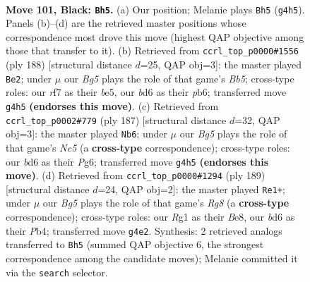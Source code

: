 \documentclass[11pt]{article}
\begin{document}
\clearpage

\begin{figure}[p]\centering
\begin{subfigure}{0.46\textwidth}\centering
\resizebox{\linewidth}{!}{%
\newchessgame
\chessboard[
  setfen={3k4/5R2/PP1B4/3N4/4B1b1/1K5p/8/6r1 b - - 2 101},
  showmover=false,
  pgfstyle=straightmove, color=movearrow, markmove={g4-h5}
]}
\caption{}
\end{subfigure}\hfill
\begin{subfigure}{0.46\textwidth}\centering
\resizebox{\linewidth}{!}{%
\newchessgame
\chessboard[
  setfen={5k2/7R/1p2p3/1B1bb3/P5K1/8/8/8 w - - 5 95},
  showmover=false,
  pgfstyle=straightmove, color=movearrow, markmove={b5-e2}
]}
\caption{}
\end{subfigure}
\\[4pt]
\begin{subfigure}{0.46\textwidth}\centering
\resizebox{\linewidth}{!}{%
\newchessgame
\chessboard[
  setfen={8/3r3p/6p1/8/2n2B2/7P/R5P1/4k1K1 b - - 61 94},
  showmover=false,
  pgfstyle=straightmove, color=movearrow, markmove={c4-b6}
]}
\caption{}
\end{subfigure}\hfill
\begin{subfigure}{0.46\textwidth}\centering
\resizebox{\linewidth}{!}{%
\newchessgame
\chessboard[
  setfen={4b3/4k1p1/8/4K3/1p5P/3B4/1PR5/6r1 b - - 4 95},
  showmover=false,
  pgfstyle=straightmove, color=movearrow, markmove={g1-e1}
]}
\caption{}
\end{subfigure}
\caption{\textbf{Move 101, Black: \texttt{Bh5}.} (a) Our position; Melanie plays \texttt{Bh5} (\texttt{g4h5}). Panels (b)--(d) are the retrieved master positions whose correspondence most drove this move (highest QAP objective among those that transfer to it). (b) Retrieved from \texttt{ccrl\_top\_p0000\#1556} (ply 188) [structural distance $d$=25, QAP obj=3]: the master played \texttt{Be2}; under $\mu$ our \emph{Bg5} plays the role of that game's \emph{Bb5}; cross-type roles: our \emph{r}f7 as their \emph{b}e5, our \emph{b}d6 as their \emph{p}b6; transferred move \texttt{g4h5} \textbf{(endorses this move)}. (c) Retrieved from \texttt{ccrl\_top\_p0002\#779} (ply 187) [structural distance $d$=32, QAP obj=3]: the master played \texttt{Nb6}; under $\mu$ our \emph{Bg5} plays the role of that game's \emph{Nc5} (a \textbf{cross-type} correspondence); cross-type roles: our \emph{b}d6 as their \emph{P}g6; transferred move \texttt{g4h5} \textbf{(endorses this move)}. (d) Retrieved from \texttt{ccrl\_top\_p0000\#1294} (ply 189) [structural distance $d$=24, QAP obj=2]: the master played \texttt{Re1+}; under $\mu$ our \emph{Bg5} plays the role of that game's \emph{Rg8} (a \textbf{cross-type} correspondence); cross-type roles: our \emph{R}g1 as their \emph{B}e8, our \emph{b}d6 as their \emph{P}b4; transferred move \texttt{g4e2}. Synthesis: 2 retrieved analogs transferred to \texttt{Bh5} (summed QAP objective 6, the strongest correspondence among the candidate moves); Melanie committed it via the \texttt{search} selector.}
\label{fig:thought-m201}
\end{figure}
\end{document}
